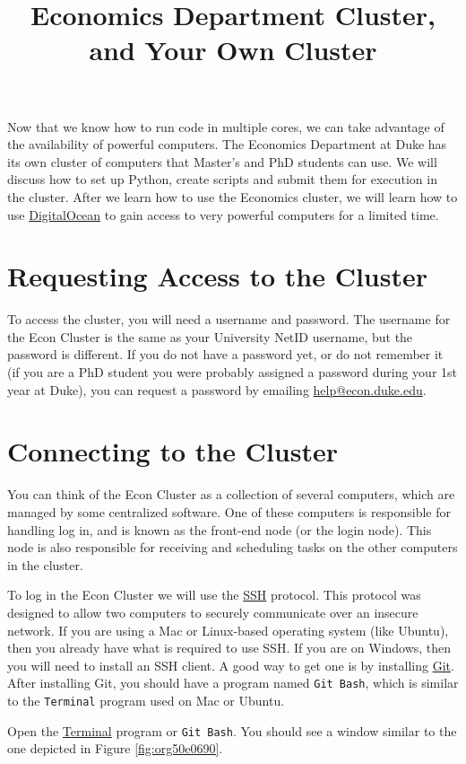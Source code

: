 \documentclass[12pt, a4paper]{article}
\date{}
\title{Economics Department Cluster, and Your Own Cluster}
\begin{document}
\maketitle
Now that we know how to run code in multiple cores, we can take advantage of the availability of powerful computers.
The Economics Department at Duke has its own cluster of computers that Master's and PhD students can use.
We will discuss how to set up Python, create scripts and submit them for execution in the cluster.
After we learn how to use the Economics cluster, we will learn how to use \href{https://m.do.co/c/c2080c9faccc}{DigitalOcean} to gain access to very powerful computers for a limited time.
\section{Requesting Access to the Cluster}
\label{sec:org7c24703}
To access the cluster, you will need a username and password.
The username for the Econ Cluster is the same as your University NetID username, but the password is different.
If you do not have a password yet, or do not remember it (if you are a PhD student you were probably assigned a password during your 1st year at Duke), you can request a password by emailing \href{mailto:help@econ.duke.edu}{help@econ.duke.edu}.
\section{Connecting to the Cluster}
\label{sec:orgc623136}
You can think of the Econ Cluster as a collection of several computers, which are managed by some centralized software.
One of these computers is responsible for handling log in, and is known as the front-end node (or the login node).
This node is also responsible for receiving and scheduling tasks on the other computers in the cluster.

To log in the Econ Cluster we will use the \href{https://en.wikipedia.org/wiki/Secure\_Shell}{SSH} protocol.
This protocol was designed to allow two computers to securely communicate over an insecure network.
If you are using a Mac or Linux-based operating system (like Ubuntu), then you already have what is required to use SSH.
If you are on Windows, then you will need to install an SSH client.
A good way to get one is by installing \href{https://git-scm.com/downloads}{Git}.
After installing Git, you should have a program named \texttt{Git Bash}, which is similar to the \texttt{Terminal} program used on Mac or Ubuntu.

Open the \href{https://support.apple.com/guide/terminal/welcome/mac}{Terminal} program or \texttt{Git Bash}. You should see a window similar to the one depicted in Figure \ref{fig:org50e0690}.
\end{document}
